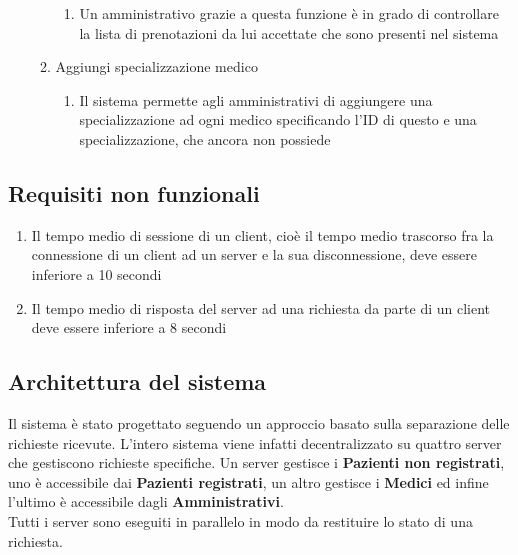 \documentclass[12pt]{report}
\begin{document}
\begin{enumerate}
\begin{enumerate}
                    \begin{enumerate}
                        \item Un amministrativo grazie a questa funzione è in grado di controllare la lista di prenotazioni da lui accettate che sono presenti nel sistema
                    \end{enumerate}
                \item Aggiungi specializzazione medico
                    \begin{enumerate}
                        \item Il sistema permette agli amministrativi di aggiungere una specializzazione ad ogni medico specificando l'ID di questo e una specializzazione, che ancora non possiede
                    \end{enumerate}
            \end{enumerate}
    \end{enumerate}

    \subsection{Requisiti non funzionali}
    \begin{enumerate}
        \item Il tempo medio di sessione di un client, cioè il tempo medio trascorso fra la connessione di un client ad un server e la sua disconnessione, deve essere inferiore a 10 secondi
        \item Il tempo medio di risposta del server ad una richiesta da parte di un client deve essere inferiore a 8 secondi
    \end{enumerate}

    \newpage
    \subsection{Architettura del sistema}
    Il sistema è stato progettato seguendo un approccio basato sulla separazione delle richieste ricevute. L'intero sistema viene infatti decentralizzato su quattro server che gestiscono richieste specifiche. Un server gestisce i \textbf{Pazienti non registrati}, uno è accessibile dai \textbf{Pazienti registrati}, un altro gestisce i \textbf{Medici} ed infine l'ultimo è accessibile  dagli \textbf{Amministrativi}.\\
    Tutti i server sono eseguiti in parallelo in modo da restituire lo stato di una richiesta.
     
\end{document}
